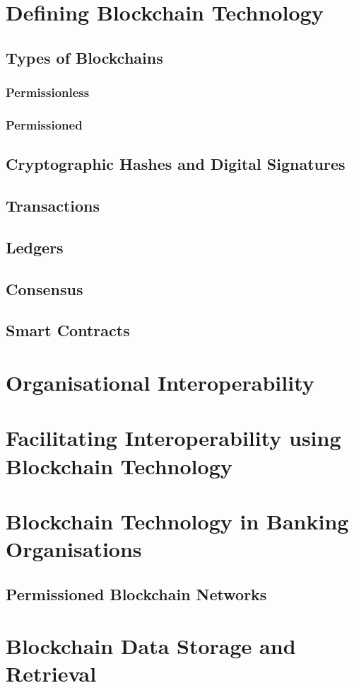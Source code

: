 \section{Defining Blockchain Technology}

\subsection{Types of Blockchains}

\subsubsection{Permissionless}

\subsubsection{Permissioned}

\subsection{Cryptographic Hashes and Digital Signatures}

\subsection{Transactions}

\subsection{Ledgers}

\subsection{Consensus}

\subsection{Smart Contracts}

\section{Organisational Interoperability}

\section{Facilitating Interoperability using Blockchain Technology}

\section{Blockchain Technology in Banking Organisations}

\subsection{Permissioned Blockchain Networks}

\section{Blockchain Data Storage and Retrieval}